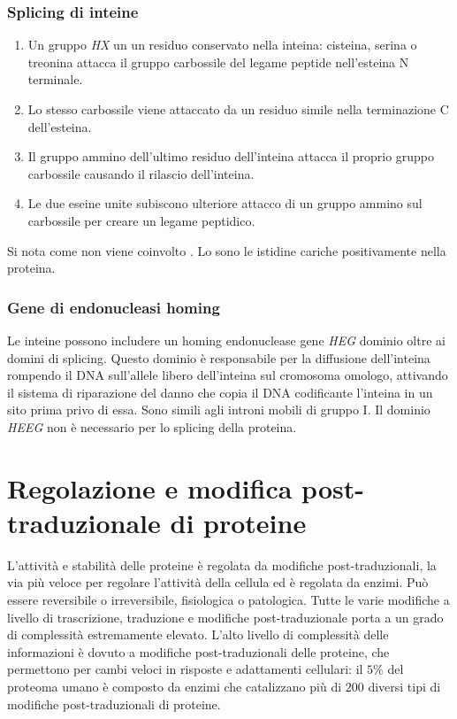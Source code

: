 \subsubsection{Splicing di inteine}
\begin{enumerate}
	\item Un gruppo \emph{HX} un un residuo conservato nella inteina: cisteina, serina o treonina attacca il gruppo carbossile del legame peptide nell'esteina N terminale. 
	\item Lo stesso carbossile viene attaccato da un residuo simile nella terminazione C dell'esteina.
	\item Il gruppo ammino dell'ultimo residuo dell'inteina attacca il proprio gruppo carbossile causando il rilascio dell'inteina. 
	\item Le due eseine unite subiscono ulteriore attacco di un gruppo ammino sul carbossile per creare un legame peptidico.
\end{enumerate}
Si nota come non viene coinvolto \emph{}. Lo sono le istidine cariche positivamente nella proteina. 
\subsubsection{Gene di endonucleasi homing}
Le inteine possono includere un homing endonuclease gene \emph{HEG} dominio oltre ai domini di splicing. Questo dominio \`e responsabile per la diffusione dell'inteina rompendo il DNA sull'allele libero dell'inteina
sul cromosoma omologo, attivando il sistema di riparazione del danno che copia il DNA codificante l'inteina in un sito prima privo di essa. Sono simili agli introni mobili di gruppo I. Il dominio \emph{HEEG} non \`e necessario
per lo splicing della proteina. 
\section{Regolazione e modifica post-traduzionale di proteine}
L'attivit\`a e stabilit\`a delle proteine \`e regolata da modifiche post-traduzionali, la via pi\`u veloce per regolare l'attivit\`a della cellula ed \`e regolata da enzimi. Pu\`o essere reversibile o irreversibile, 
fisiologica o patologica. Tutte le varie modifiche a livello di trascrizione, traduzione e modifiche post-traduzionale porta a un grado di complessit\`a estremamente elevato. L'alto livello di complessit\`a delle informazioni
\`e dovuto a modifiche post-traduzionali delle proteine, che permettono per cambi veloci in risposte e adattamenti cellulari: il $5\%$ del proteoma umano \`e composto da enzimi che catalizzano pi\`u di $200$ diversi tipi 
di modifiche post-traduzionali di proteine. 
